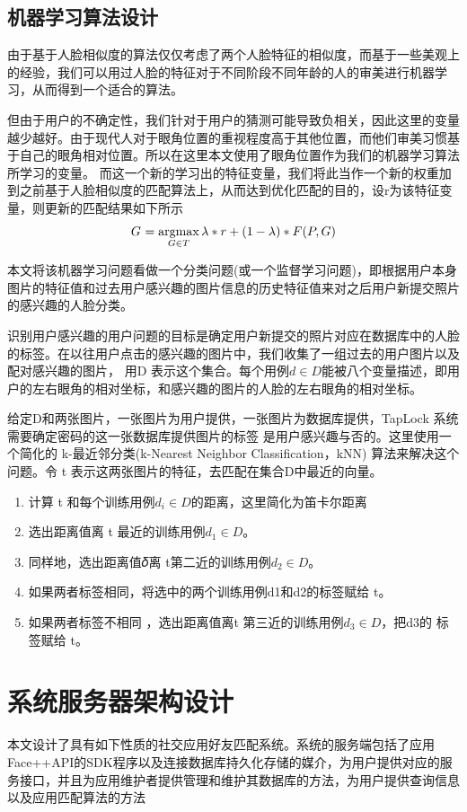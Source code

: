 \subsection{机器学习算法设计}
由于基于人脸相似度的算法仅仅考虑了两个人脸特征的相似度，而基于一些美观上的经验，我们可以用过人脸的特征对于不同阶段不同年龄的人的审美进行机器学习，从而得到一个适合的算法。

但由于用户的不确定性，我们针对于用户的猜测可能导致负相关，因此这里的变量越少越好。由于现代人对于眼角位置的重视程度高于其他位置，而他们审美习惯基于自己的眼角相对位置。所以在这里本文使用了眼角位置作为我们的机器学习算法所学习的变量。
而这一个新的学习出的特征变量，我们将此当作一个新的权重加到之前基于人脸相似度的匹配算法上，从而达到优化匹配的目的，设r为该特征变量，则更新的匹配结果如下所示
\begin{equation*}
G^{\*} = \mathop{\argmax_{G \in T}}{\lambda * r+(1-\lambda)* F(P,G)}
\end{equation*}

本文将该机器学习问题看做一个分类问题(或一个监督学习问题)，即根据用户本身图片的特征值和过去用户感兴趣的图片信息的历史特征值来对之后用户新提交照片的感兴趣的人脸分类。

识别用户感兴趣的用户问题的目标是确定用户新提交的照片对应在数据库中的人脸的标签。在以往用户点击的感兴趣的图片中，我们收集了一组过去的用户图片以及配对感兴趣的图片， 用D 表示这个集合。每个用例$d \in D$能被八个变量描述，即用户的左右眼角的相对坐标，和感兴趣的图片的人脸的左右眼角的相对坐标。

给定D和两张图片，一张图片为用户提供，一张图片为数据库提供，TapLock 系统需要确定密码的这一张数据库提供图片的标签 是用户感兴趣与否的。这里使用一个简化的 k-最近邻分类(k-Nearest Neighbor Classification，kNN)\parencite{ML1}\parencite{ML2}\parencite{ML3} 算法来解决这个问题。令 t 表示这两张图片的特征，去匹配在集合D中最近的向量。
\begin{enumerate}
\item 计算 t 和每个训练用例$d_{i} \in D$的距离，这里简化为笛卡尔距离
\item 选出距离值离 t 最近的训练用例$d_{1} \in D$。
\item 同样地，选出距离值𝛿离 t第二近的训练用例$d_{2} \in D$。
\item 如果两者标签相同，将选中的两个训练用例d1和d2的标签赋给 t。
\item 如果两者标签不相同 ，选出距离值离t 
第三近的训练用例$d_{3} \in D$，把d3的
标签赋给 t。
\end{enumerate}

\section{系统服务器架构设计}
本文设计了具有如下性质的社交应用好友匹配系统。系统的服务端包括了应用Face++API的SDK程序以及连接数据库持久化存储的媒介，为用户提供对应的服务接口，并且为应用维护者提供管理和维护其数据库的方法，为用户提供查询信息以及应用匹配算法的方法

